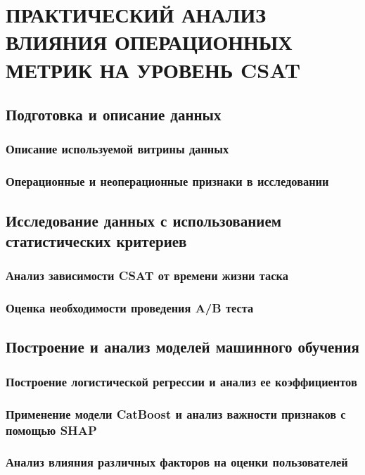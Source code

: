 \section{ПРАКТИЧЕСКИЙ АНАЛИЗ ВЛИЯНИЯ ОПЕРАЦИОННЫХ МЕТРИК НА УРОВЕНЬ CSAT}

\subsection{Подготовка и описание данных}
\subsubsection{Описание используемой витрины данных}
\subsubsection{Операционные и неоперационные признаки в исследовании}

\subsection{Исследование данных с использованием статистических критериев}
\subsubsection{Анализ зависимости CSAT от времени жизни таска}
\subsubsection{Оценка необходимости проведения A/B теста}

\subsection{Построение и анализ моделей машинного обучения}
\subsubsection{Построение логистической регрессии и анализ ее коэффициентов}
\subsubsection{Применение модели CatBoost и анализ важности признаков с помощью SHAP}
\subsubsection{Анализ влияния различных факторов на оценки пользователей}


\clearpage